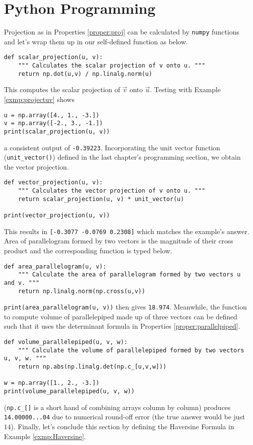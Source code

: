 \section{Python Programming}
Projection as in Properties \ref{proper:proj} can be calculated by \verb|numpy| functions and let's wrap them up in our self-defined function as below.
\begin{lstlisting}
def scalar_projection(u, v):
    """ Calculates the scalar projection of v onto u. """
    return np.dot(u,v) / np.linalg.norm(u)
\end{lstlisting}
This computes the scalar projection of $\vec{v}$ onto $\vec{u}$. Testing with Example \ref{exmp:projectuv} shows 
\begin{lstlisting}
u = np.array([4., 1., -3.])
v = np.array([-2., 3., -1.])
print(scalar_projection(u, v))    
\end{lstlisting}
a consistent output of \texttt{-0.39223}. Incorporating the unit vector function (\verb|unit_vector()|) defined in the last chapter's programming section, we obtain the vector projection.
\begin{lstlisting}
def vector_projection(u, v):
    """ Calculates the vector projection of v onto u. """
    return scalar_projection(u, v) * unit_vector(u)

print(vector_projection(u, v))    
\end{lstlisting}
This results in \texttt{[-0.3077 -0.0769  0.2308]} which matches the example's answer. Area of parallelogram formed by two vectors is the magnitude of their cross product and the corresponding function is typed below.
\begin{lstlisting}
def area_parallelogram(u, v):
    """ Calculate the area of parallelogram formed by two vectors u and v. """
    return np.linalg.norm(np.cross(u,v))
\end{lstlisting}
\verb|print(area_parallelogram(u, v))| then gives \texttt{18.974}. Meanwhile, the function to compute volume of parallelepiped made up of three vectors can be defined such that it uses the determinant formula in Properties \ref{proper:parallelpiped}.
\begin{lstlisting}
def volume_parallelepiped(u, v, w):
    """ Calculate the volume of parallelepiped formed by two vectors u, v, w. """
    return np.abs(np.linalg.det(np.c_[u,v,w]))

w = np.array([1., 2., -3.])
print(volume_parallelepiped(u, v, w))
\end{lstlisting}
(\verb|np.c_[]| is a short hand of combining arrays column by column) produces \texttt{14.00000...04} due to numerical round-off error (the true answer would be just $14$). Finally, let's conclude this section by defining the Haversine Formula in Example \ref{exmp:Haversine}.
